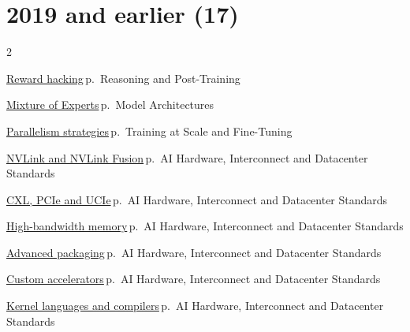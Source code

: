 \documentclass[10pt,a4paper,openany]{report}
\begin{document}
\section{2019 and earlier (17)}
\begin{multicols}{2}\small\raggedright
\hyperref[c:reasoning-9]{Reward hacking}\,{\color{muted}\scriptsize p.\,\pageref{c:reasoning-9}} {\color{muted}\scriptsize Reasoning and Post-Training}\par\vspace{2pt}
\hyperref[c:arch-0]{Mixture of Experts}\,{\color{muted}\scriptsize p.\,\pageref{c:arch-0}} {\color{muted}\scriptsize Model Architectures}\par\vspace{2pt}
\hyperref[c:training-0]{Parallelism strategies}\,{\color{muted}\scriptsize p.\,\pageref{c:training-0}} {\color{muted}\scriptsize Training at Scale and Fine-Tuning}\par\vspace{2pt}
\hyperref[c:hardware-6]{NVLink and NVLink Fusion}\,{\color{muted}\scriptsize p.\,\pageref{c:hardware-6}} {\color{muted}\scriptsize AI Hardware, Interconnect and Datacenter Standards}\par\vspace{2pt}
\hyperref[c:hardware-7]{CXL, PCIe and UCIe}\,{\color{muted}\scriptsize p.\,\pageref{c:hardware-7}} {\color{muted}\scriptsize AI Hardware, Interconnect and Datacenter Standards}\par\vspace{2pt}
\hyperref[c:hardware-8]{High-bandwidth memory}\,{\color{muted}\scriptsize p.\,\pageref{c:hardware-8}} {\color{muted}\scriptsize AI Hardware, Interconnect and Datacenter Standards}\par\vspace{2pt}
\hyperref[c:hardware-9]{Advanced packaging}\,{\color{muted}\scriptsize p.\,\pageref{c:hardware-9}} {\color{muted}\scriptsize AI Hardware, Interconnect and Datacenter Standards}\par\vspace{2pt}
\hyperref[c:hardware-11]{Custom accelerators}\,{\color{muted}\scriptsize p.\,\pageref{c:hardware-11}} {\color{muted}\scriptsize AI Hardware, Interconnect and Datacenter Standards}\par\vspace{2pt}
\hyperref[c:hardware-13]{Kernel languages and compilers}\,{\color{muted}\scriptsize p.\,\pageref{c:hardware-13}} {\color{muted}\scriptsize AI Hardware, Interconnect and Datacenter Standards}\par\vspace{2pt}

\end{multicols}
\end{document}
